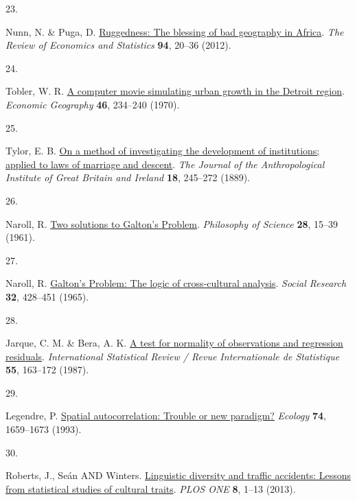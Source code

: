 \documentclass[
  man,floatsintext]{apa6}
\newlength{\cslhangindent}
\newlength{\csllabelwidth}
\newlength{\cslentryspacingunit} %
\newenvironment{CSLReferences}[2] %
 {%
  \setlength{\parindent}{0pt}
  \ifodd #1
  \let\oldpar\par
  \def\par{\hangindent=\cslhangindent\oldpar}
  \fi
  \setlength{\parskip}{#2\cslentryspacingunit}
 }%
 {}
\newcommand{\CSLLeftMargin}[1]{\parbox[t]{\csllabelwidth}{#1}}
\newcommand{\CSLRightInline}[1]{\parbox[t]{\linewidth - \csllabelwidth}{#1}\break}
\begin{document}
\begin{CSLReferences}{0}{0}
\leavevmode{}%
\CSLLeftMargin{23. }%
\CSLRightInline{Nunn, N. \& Puga, D. \href{https://doi.org/10.1162/REST_a_00161}{Ruggedness: The blessing of bad geography in {A}frica}. \emph{The Review of Economics and Statistics} \textbf{94}, 20--36 (2012).}

\leavevmode{}%
\CSLLeftMargin{24. }%
\CSLRightInline{Tobler, W. R. \href{https://doi.org/10.2307/143141}{A computer movie simulating urban growth in the {D}etroit region}. \emph{Economic Geography} \textbf{46}, 234--240 (1970).}

\leavevmode{}%
\CSLLeftMargin{25. }%
\CSLRightInline{Tylor, E. B. \href{https://doi.org/10.2307/2842423}{On a method of investigating the development of institutions; applied to laws of marriage and descent}. \emph{The Journal of the Anthropological Institute of Great Britain and Ireland} \textbf{18}, 245--272 (1889).}

\leavevmode{}%
\CSLLeftMargin{26. }%
\CSLRightInline{Naroll, R. \href{https://doi.org/10.1086/287778}{Two solutions to {G}alton's {P}roblem}. \emph{Philosophy of Science} \textbf{28}, 15--39 (1961).}

\leavevmode{}%
\CSLLeftMargin{27. }%
\CSLRightInline{Naroll, R. \href{http://www.jstor.org/stable/40969817}{Galton's {P}roblem: The logic of cross-cultural analysis}. \emph{Social Research} \textbf{32}, 428--451 (1965).}

\leavevmode{}%
\CSLLeftMargin{28. }%
\CSLRightInline{Jarque, C. M. \& Bera, A. K. \href{https://doi.org/10.2307/1403192}{A test for normality of observations and regression residuals}. \emph{International Statistical Review / Revue Internationale de Statistique} \textbf{55}, 163--172 (1987).}

\leavevmode{}%
\CSLLeftMargin{29. }%
\CSLRightInline{Legendre, P. \href{https://doi.org/10.2307/1939924}{Spatial autocorrelation: Trouble or new paradigm?} \emph{Ecology} \textbf{74}, 1659--1673 (1993).}

\leavevmode{}%
\CSLLeftMargin{30. }%
\CSLRightInline{Roberts, J., Seán AND Winters. \href{https://doi.org/10.1371/journal.pone.0070902}{Linguistic diversity and traffic accidents: Lessons from statistical studies of cultural traits}. \emph{PLOS ONE} \textbf{8}, 1--13 (2013).}


\end{CSLReferences}
\end{document}

